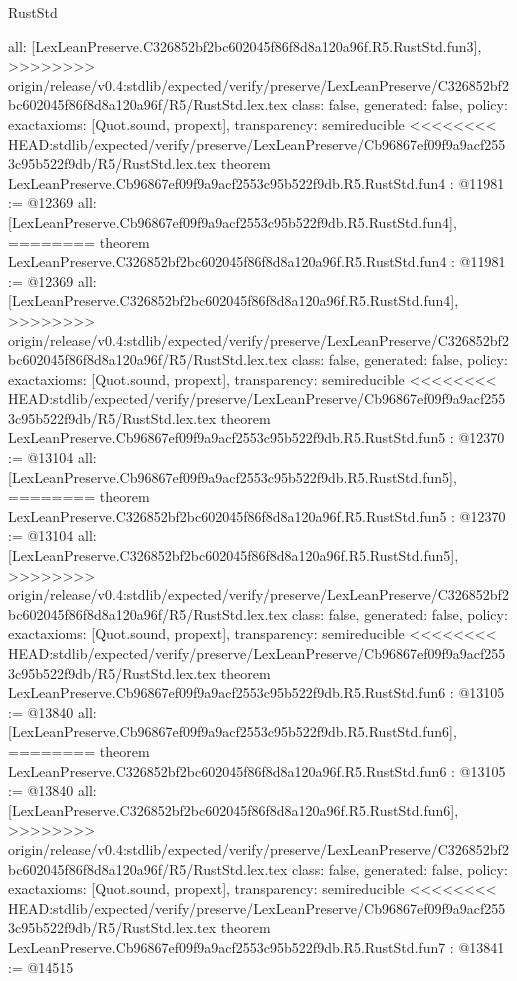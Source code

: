 \begin{lexlean}{RustStd}
\begin{coremodule}
{\begin{coremodule}
{{{{{{{  all: [LexLeanPreserve.C326852bf2bc602045f86f8d8a120a96f.R5.RustStd.fun3],
>>>>>>>> origin/release/v0.4:stdlib/expected/verify/preserve/LexLeanPreserve/C326852bf2bc602045f86f8d8a120a96f/R5/RustStd.lex.tex
  class: false,
  generated: false,
  policy: exact{axioms: [Quot.sound, propext]},
  transparency: semireducible
}
<<<<<<<< HEAD:stdlib/expected/verify/preserve/LexLeanPreserve/Cb96867ef09f9a9acf2553c95b522f9db/R5/RustStd.lex.tex
theorem LexLeanPreserve.Cb96867ef09f9a9acf2553c95b522f9db.R5.RustStd.fun4 : @11981 := @12369 {
  all: [LexLeanPreserve.Cb96867ef09f9a9acf2553c95b522f9db.R5.RustStd.fun4],
========
theorem LexLeanPreserve.C326852bf2bc602045f86f8d8a120a96f.R5.RustStd.fun4 : @11981 := @12369 {
  all: [LexLeanPreserve.C326852bf2bc602045f86f8d8a120a96f.R5.RustStd.fun4],
>>>>>>>> origin/release/v0.4:stdlib/expected/verify/preserve/LexLeanPreserve/C326852bf2bc602045f86f8d8a120a96f/R5/RustStd.lex.tex
  class: false,
  generated: false,
  policy: exact{axioms: [Quot.sound, propext]},
  transparency: semireducible
}
<<<<<<<< HEAD:stdlib/expected/verify/preserve/LexLeanPreserve/Cb96867ef09f9a9acf2553c95b522f9db/R5/RustStd.lex.tex
theorem LexLeanPreserve.Cb96867ef09f9a9acf2553c95b522f9db.R5.RustStd.fun5 : @12370 := @13104 {
  all: [LexLeanPreserve.Cb96867ef09f9a9acf2553c95b522f9db.R5.RustStd.fun5],
========
theorem LexLeanPreserve.C326852bf2bc602045f86f8d8a120a96f.R5.RustStd.fun5 : @12370 := @13104 {
  all: [LexLeanPreserve.C326852bf2bc602045f86f8d8a120a96f.R5.RustStd.fun5],
>>>>>>>> origin/release/v0.4:stdlib/expected/verify/preserve/LexLeanPreserve/C326852bf2bc602045f86f8d8a120a96f/R5/RustStd.lex.tex
  class: false,
  generated: false,
  policy: exact{axioms: [Quot.sound, propext]},
  transparency: semireducible
}
<<<<<<<< HEAD:stdlib/expected/verify/preserve/LexLeanPreserve/Cb96867ef09f9a9acf2553c95b522f9db/R5/RustStd.lex.tex
theorem LexLeanPreserve.Cb96867ef09f9a9acf2553c95b522f9db.R5.RustStd.fun6 : @13105 := @13840 {
  all: [LexLeanPreserve.Cb96867ef09f9a9acf2553c95b522f9db.R5.RustStd.fun6],
========
theorem LexLeanPreserve.C326852bf2bc602045f86f8d8a120a96f.R5.RustStd.fun6 : @13105 := @13840 {
  all: [LexLeanPreserve.C326852bf2bc602045f86f8d8a120a96f.R5.RustStd.fun6],
>>>>>>>> origin/release/v0.4:stdlib/expected/verify/preserve/LexLeanPreserve/C326852bf2bc602045f86f8d8a120a96f/R5/RustStd.lex.tex
  class: false,
  generated: false,
  policy: exact{axioms: [Quot.sound, propext]},
  transparency: semireducible
}
<<<<<<<< HEAD:stdlib/expected/verify/preserve/LexLeanPreserve/Cb96867ef09f9a9acf2553c95b522f9db/R5/RustStd.lex.tex
theorem LexLeanPreserve.Cb96867ef09f9a9acf2553c95b522f9db.R5.RustStd.fun7 : @13841 := @14515 {
}}}}}}}}}}
\end{coremodule}}
\end{coremodule}
\end{lexlean}
